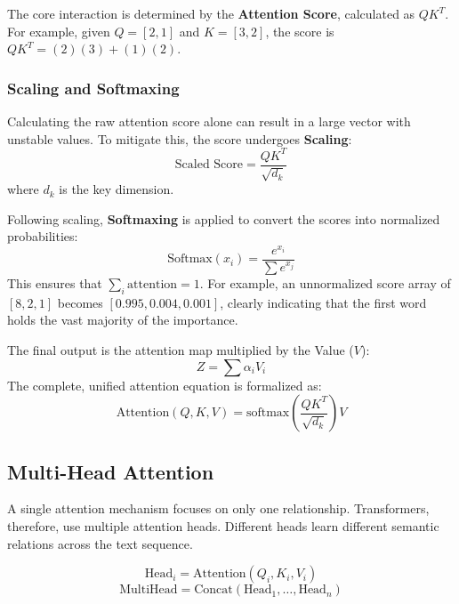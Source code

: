 \documentclass[10pt, conference]{IEEEtran}
\begin{document}
The core interaction is determined by the \textbf{Attention Score}, calculated as $Q K^T$. For example, given $Q = [2, 1]$ and $K = [3, 2]$, the score is $Q K^T = (2)(3) + (1)(2)$.

\subsubsection{\textbf{Scaling and Softmaxing}}
Calculating the raw attention score alone can result in a large vector with unstable values. To mitigate this, the score undergoes \textbf{Scaling}:
\begin{equation}
    \text{Scaled Score} = \frac{Q K^T}{\sqrt{d_k}}
\end{equation}
where $d_k$ is the key dimension.

Following scaling, \textbf{Softmaxing} is applied to convert the scores into normalized probabilities:
\begin{equation}
    \text{Softmax}(x_i) = \frac{e^{x_i}}{\sum e^{x_j}}
\end{equation}
This ensures that $\sum_i \text{attention} = 1$. For example, an unnormalized score array of $[8, 2, 1]$ becomes $[0.995, 0.004, 0.001]$, clearly indicating that the first word holds the vast majority of the importance.

The final output is the attention map multiplied by the Value ($V$):
\begin{equation}
    Z = \sum \alpha_i V_i
\end{equation}
The complete, unified attention equation is formalized as:
\begin{equation}
    \text{Attention}(Q, K, V) = \text{softmax}\left(\frac{Q K^T}{\sqrt{d_k}}\right) V
\end{equation}

\subsection{\textbf{Multi-Head Attention}}
A single attention mechanism focuses on only one relationship. Transformers, therefore, use multiple attention heads. Different heads learn different semantic relations across the text sequence.

\begin{equation}
    \text{Head}_i = \text{Attention}(Q_i, K_i, V_i)
\end{equation}
\begin{equation}
    \text{MultiHead} = \text{Concat}(\text{Head}_1, \dots, \text{Head}_n)
\end{equation}
\end{document}
